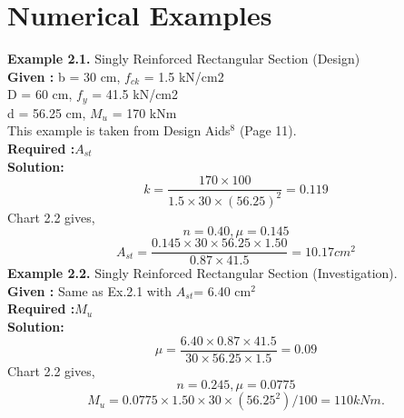 \section{Numerical Examples}
\textbf{Example 2.1.} Singly Reinforced Rectangular Section (Design)\\
\textbf{Given :} 
b = 30 cm, ${f_{ck}}$ = 1.5 kN/cm2\\
 D = 60 cm, ${f_y}$ = 41.5 kN/cm2\\
d = 56.25 cm, ${M_u}$  = 170 kNm\\
This example is taken from Design Aids$^{8}$ (Page 11).\\
\textbf{Required :}${A_{st}}$\\
\textbf{Solution:}
\begin{equation*}
 k= \frac{170 \times 100}{1.5 \times 30 \times (56.25)^2} =0.119
\end{equation*}
Chart 2.2 gives,
\begin{equation*}
n=0.40, \mu=0.145
\end{equation*}
\begin{equation*}
A_{st}=\frac{0.145 \times 30 \times 56.25 \times 1.50}{0.87 \times 41.5} = 10.17 cm^2
\end{equation*}
\textbf{Example 2.2.} Singly Reinforced Rectangular Section (Investigation).\\
\textbf{Given :} Same as Ex.2.1 with ${A_{st}}$= 6.40 cm$^{2}$\\
\textbf{Required :}${M_{u}}$\\
\textbf{Solution:} 
\begin{equation*}
\mu=\frac{6.40 \times 0.87 \times 41.5}{30 \times 56.25 \times 1.5} =0.09
\end{equation*}
Chart 2.2 gives,
\begin{equation*}
n=0.245, \mu=0.0775
\end{equation*}
\begin{equation*}
M_{u}=0.0775 \times 1.50 \times 30 \times (56.25^2)/100= 110kNm.
\end{equation*}
\newpage
